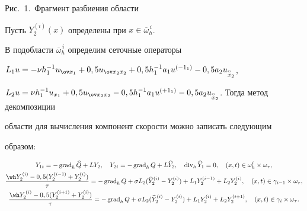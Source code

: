 \vskip -3.7cm





\centerline{Рис.~1.~Фрагмент разбиения области}





\vskip 3mm





Пусть $Y_2^{(i)}(x)$ определены при $x\in{\overline\omega}_h^{\,i}$.


В подобласти ${\overline\omega}_h^{\,i}$ определим сеточные операторы


$L_1u=-\nu h_1^{-1}u_{\ov x_1}+0,5u_{\ov


x_2x_2}+0,5h_1^{-1}a_1u


^{(-1_1)}-0,5a_2u_{\overset{\circ}{x}{}_2}$,


$L_2u=\nu h_1^{-1}u_{x_1}+0,5u_{\ov x_2x_2}-0,5h_1^{-1}a_1u


^{(+1_1)}-0,5a_2u_{\overset{\circ}{x}{}_2}$. Тогда метод декомпозиции


области для вычисления компонент скорости можно записать следующим


образом:


\begin{gather}


Y_{1t}=-\Grad_h\widehat Q+LY_2,\quad


Y_{2t}=-\Grad_hQ+L\widehat Y_2,\quad


\Div_h\widehat Y_1=0,\quad


(x,t)\in\omega_h^{i}\times\omega_\tau,\notag\\


%


\frac{\wh Y_2^{\,(i)}-0,5(Y_2^{(i-1)}+Y_2^{(i)})}{\tau}=-\Grad_hQ+\sigma


L_2(\widehat Y_2^{(i)}-Y_2^{(i)})+L_1Y_2^{(i-1)}+L_2Y_2^{(i)},\quad


(x,t)\in\gamma_{i-1}\times\omega_\tau,\\


%


\frac{\wh Y_2^{\,(i)}-0,5(Y_2^{(i+1)}+Y_2^{(i)})}{\tau}=-\Grad_hQ+\sigma


L_2(\widehat Y_2^{(i)}-Y_2^{(i)})+L_1Y_2^{(i)}+L_2Y_2^{(i+1)},\quad


(x,t)\in\gamma_{i}\times\omega_\tau.\notag


\end{gather}





